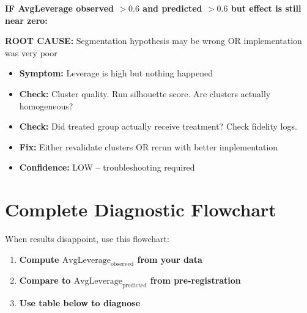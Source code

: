\textbf{IF AvgLeverage observed $> 0.6$ and predicted $> 0.6$ but effect is still near zero:}

\textbf{ROOT CAUSE:} Segmentation hypothesis may be wrong OR implementation was very poor

\begin{itemize}[nosep]
\item \textbf{Symptom:} Leverage is high but nothing happened
\item \textbf{Check:} Cluster quality. Run silhouette score. Are clusters actually homogeneous?
\item \textbf{Check:} Did treated group actually receive treatment? Check fidelity logs.
\item \textbf{Fix:} Either revalidate clusters OR rerun with better implementation
\item \textbf{Confidence:} LOW -- troubleshooting required
\end{itemize}


\section{Complete Diagnostic Flowchart}
\label{sec:h4-flowchart}

When results disappoint, use this flowchart:

\vspace{1em}

\begin{enumerate}
\item \textbf{Compute $\text{AvgLeverage}_{\text{observed}}$ from your data}
\item \textbf{Compare to $\text{AvgLeverage}_{\text{predicted}}$ from pre-registration}
\item \textbf{Use table below to diagnose}
\end{enumerate}

